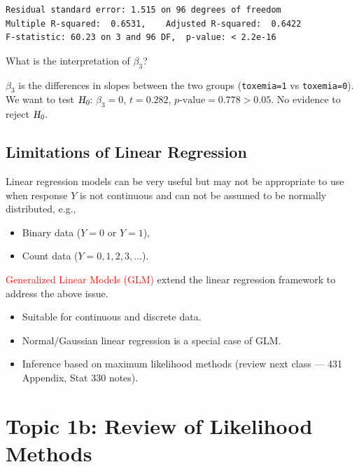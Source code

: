 \documentclass{article}\usepackage[]{graphicx}\usepackage[svgnames]{xcolor}
\makeatletter
\newenvironment{kframe}{%
 \def\at@end@of@kframe{}%
 \ifinner\ifhmode%
  \def\at@end@of@kframe{\end{minipage}}%
  \begin{minipage}{\columnwidth}%
 \fi\fi%
 \def\FrameCommand##1{\hskip\@totalleftmargin \hskip-\fboxsep
 \colorbox{shadecolor}{##1}\hskip-\fboxsep
     \hskip-\linewidth \hskip-\@totalleftmargin \hskip\columnwidth}%
 \MakeFramed {\advance\hsize-\width
   \@totalleftmargin\z@ \linewidth\hsize
   \@setminipage}}%
 {\par\unskip\endMakeFramed%
 \at@end@of@kframe}
\newenvironment{knitrout}{}{} %
\newcommand{\HN}{\textsl{H}_{\textsl{0}}}%
\newcommand{\makeheading}[2]%
{%
\begin{center}%
    \makebox[\linewidth]{\raisebox{-.5ex}[0cm][0cm]{\stackanchor{\textcolor{Gray}{\textsc{#1}}}{\scriptsize\itshape\printyearoff#2}\;}\color{Crimson!50}\hrulefill}%
\end{center}%
}%
\makeatother
\begin{document}
\begin{itemize}
\begin{knitrout}
\begin{kframe}
\begin{verbatim}
Residual standard error: 1.515 on 96 degrees of freedom
Multiple R-squared:  0.6531,	Adjusted R-squared:  0.6422 
F-statistic: 60.23 on 3 and 96 DF,  p-value: < 2.2e-16
\end{verbatim}
\end{kframe}
\end{knitrout}
            What is the interpretation of $ \beta_3 $?

            $ \beta_3 $ is the differences in slopes between the two groups (\texttt{toxemia=1} vs \texttt{toxemia=0}).
            We want to test $ \HN $: $ \beta_3=0 $, $ t=0.282 $, $ p\text{-value}=0.778>0.05 $. No evidence to reject $ \HN $.
\end{itemize}

\subsection*{Limitations of Linear Regression}
Linear regression models can be very useful but may not be appropriate to use
when response $ Y $ is not continuous and can not be assumed to be normally
distributed, e.g.,
\begin{itemize}
      \item Binary data ($ Y=0 $ or $ Y=1 $),
      \item Count data ($ Y=0,1,2,3,\ldots $).
\end{itemize}
\textcolor{Red}{Generalized Linear Models (GLM)} extend the linear regression framework to
address the above issue.
\begin{itemize}
      \item Suitable for continuous and discrete data.
      \item Normal/Gaussian linear regression is a special case of GLM.
      \item Inference based on maximum likelihood methods (review next class --- 431
            Appendix, Stat 330 notes).
\end{itemize}

\makeheading{Week 2}{\daterange{2021-09-13}{2021-09-17}}
\section*{Topic 1b: Review of Likelihood Methods}
\end{document}
